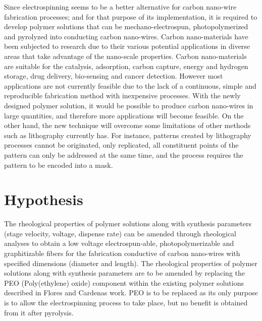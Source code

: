 Since electrospinning seems to be a better alternative for carbon nano-wire fabrication processes; and for that purpose of its implementation, it is required to develop polymer solutions that can be mechano-electrospun, photopolymerized and pyrolyzed into conducting carbon nano-wires. Carbon nano-materials have been subjected to research due to their various potential applications in diverse areas that take advantage of the nano-scale properties. \cite{Siddiqui2019} Carbon nano-materials are suitable for the catalysis, adsorption, carbon capture, energy and hydrogen storage, drug delivery, bio-sensing and cancer detection. \cite{Siddiqui2019} However most applications are not currently feasible due to the lack of a continuous, simple and reproducible fabrication method with inexpensive processes. With the newly designed polymer solution, it would be possible to produce carbon nano-wires in large quantities, and therefore more applications will become feasible. On the other hand, the new technique will overcome some limitations of other methods such as lithography currently has. For instance, patterns created by lithography processes cannot be originated, only replicated, all constituent points of the pattern can only be addressed at the same time, and the process requires the pattern to be encoded into a mask. \cite{Landis2011}

\section{Hypothesis}

The rheological properties of polymer solutions along with synthesis parameters (stage velocity, voltage, dispense rate) can be amended through rheological analyses to obtain a low voltage electrospun-able, photopolymerizable and graphitizable fibers for the fabrication conductive of carbon nano-wires with specified dimensions (diameter and length). The rheological properties of polymer solutions along with synthesis parameters are to be amended by replacing the PEO (Poly(ethylene) oxide) component within the existing polymer solutions described in Flores \cite{Flores2017} and Cardenas \cite{Cardenas2017} work. PEO is to be replaced as its only purpose is to allow the electrospinning process to take place, but no benefit is obtained from it after pyrolysis.

